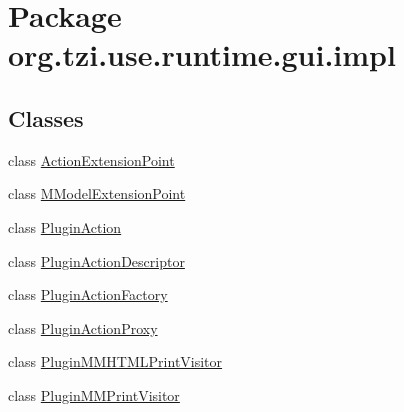 \hypertarget{namespaceorg_1_1tzi_1_1use_1_1runtime_1_1gui_1_1impl}{\section{Package org.\-tzi.\-use.\-runtime.\-gui.\-impl}
\label{namespaceorg_1_1tzi_1_1use_1_1runtime_1_1gui_1_1impl}
}
\subsection*{Classes}
\begin{DoxyCompactItemize}
\item 
class \hyperlink{classorg_1_1tzi_1_1use_1_1runtime_1_1gui_1_1impl_1_1_action_extension_point}{Action\-Extension\-Point}
\item 
class \hyperlink{classorg_1_1tzi_1_1use_1_1runtime_1_1gui_1_1impl_1_1_m_model_extension_point}{M\-Model\-Extension\-Point}
\item 
class \hyperlink{classorg_1_1tzi_1_1use_1_1runtime_1_1gui_1_1impl_1_1_plugin_action}{Plugin\-Action}
\item 
class \hyperlink{classorg_1_1tzi_1_1use_1_1runtime_1_1gui_1_1impl_1_1_plugin_action_descriptor}{Plugin\-Action\-Descriptor}
\item 
class \hyperlink{classorg_1_1tzi_1_1use_1_1runtime_1_1gui_1_1impl_1_1_plugin_action_factory}{Plugin\-Action\-Factory}
\item 
class \hyperlink{classorg_1_1tzi_1_1use_1_1runtime_1_1gui_1_1impl_1_1_plugin_action_proxy}{Plugin\-Action\-Proxy}
\item 
class \hyperlink{classorg_1_1tzi_1_1use_1_1runtime_1_1gui_1_1impl_1_1_plugin_m_m_h_t_m_l_print_visitor}{Plugin\-M\-M\-H\-T\-M\-L\-Print\-Visitor}
\item 
class \hyperlink{classorg_1_1tzi_1_1use_1_1runtime_1_1gui_1_1impl_1_1_plugin_m_m_print_visitor}{Plugin\-M\-M\-Print\-Visitor}
\end{DoxyCompactItemize}
